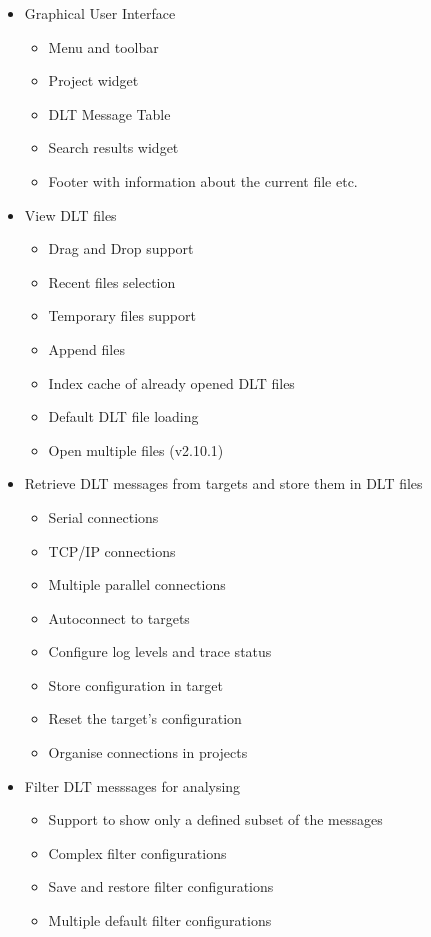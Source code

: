 \documentclass[a4paper,11pt]{article}
\begin{document}
\begin{itemize}
\item Graphical User Interface
  \begin{itemize}
    \item Menu and toolbar
    \item Project widget
    \item DLT Message Table
    \item Search results widget
    \item Footer with information about the current file etc.
  \end{itemize}
\item View DLT files
 \begin{itemize}
    \item Drag and Drop support
    \item Recent files selection
    \item Temporary files support
    \item Append files
    \item Index cache of already opened DLT files
    \item Default DLT file loading
    \item Open multiple files (v2.10.1)
 \end{itemize}
\item Retrieve DLT messages from targets and store them in DLT files
 \begin{itemize}
    \item Serial connections
    \item TCP/IP connections
    \item Multiple parallel connections
    \item Autoconnect to targets
    \item Configure log levels and trace status
    \item Store configuration in target
    \item Reset the target's configuration
    \item Organise connections in projects
 \end{itemize}
\item Filter DLT messsages for analysing
 \begin{itemize}
    \item Support to show only a defined subset of the messages
    \item Complex filter configurations
    \item Save and restore filter configurations
    \item Multiple default filter configurations

\end{itemize}
\end{itemize}
\end{document}
